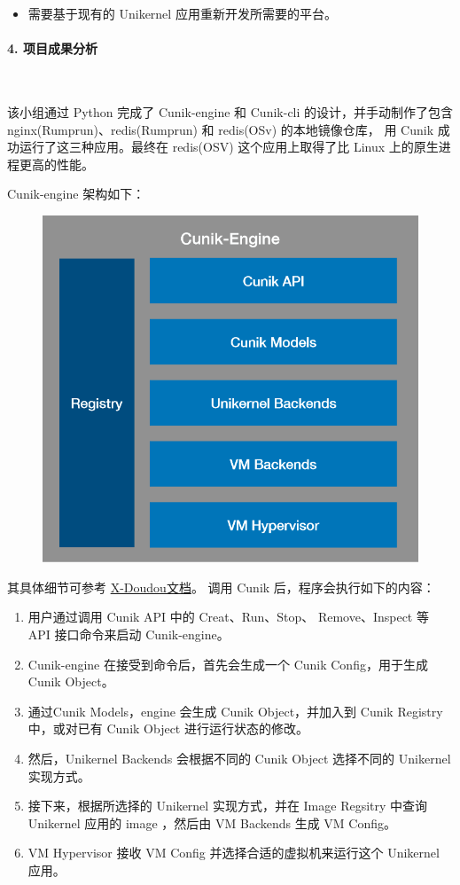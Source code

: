 \documentclass[UTF8,fontset=none,linespread=1.15]{ctexart}
\begin{document}
\begin{itemize}
\item 需要基于现有的 Unikernel 应用重新开发所需要的平台。
\end{itemize}

\paragraph{4. 项目成果分析}~\par

该小组通过 Python 完成了 Cunik-engine 和 Cunik-cli 的设计，并手动制作了包含 nginx(Rumprun)、redis(Rumprun) 和 redis(OSv) 的本地镜像仓库，
用 Cunik 成功运行了这三种应用。最终在 redis(OSV) 这个应用上取得了比 Linux 上的原生进程更高的性能。

Cunik-engine 架构如下：
\begin{figure}[H]
\centering
\includegraphics[width=0.5\linewidth]{pictures/resp1.png}
\caption{}
\end{figure}
其具体细节可参考
\href{https://github.com/OSH-2018/X-Doudou/tree/master/concluding-report}{X-Doudou文档}。
调用 Cunik 后，程序会执行如下的内容：

\begin{enumerate}
\item 用户通过调用 Cunik API 中的 Creat、Run、Stop、
Remove、Inspect 等 API 接口命令来启动 Cunik-engine。
\item Cunik-engine 在接受到命令后，首先会生成一个 Cunik
Config，用于生成 Cunik Object。
\item 通过Cunik Models，engine 会生成 Cunik Object，并加入到
Cunik Registry 中，或对已有 Cunik Object 进行运行状态的修改。
\item 然后，Unikernel Backends 会根据不同的 Cunik Object
选择不同的 Unikernel 实现方式。
\item 接下来，根据所选择的 Unikernel 实现方式，并在 Image Regsitry
中查询 Unikernel 应用的 image ，然后由 VM Backends 生成 VM Config。
\item VM Hypervisor 接收 VM Config 并选择合适的虚拟机来运行这个
Unikernel 应用。
\end{enumerate}
\end{document}
